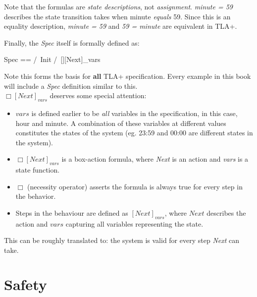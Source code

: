 Note that the formulas are \textit{state descriptions}, not \textit{assignment}.
\textit{minute = 59} describes the state transition takes when minute
\textit{equals} 59. Since this is an equality description, \textit{minute = 59}
and \textit{59 = minute} are equivalent in TLA+.\newline

Finally, the \textit{Spec} itself is formally defined as:\newline
\begin{tla}
    Spec ==
        /\ Init
        /\ [][Next]_vars
\end{tla}
\begin{tlatex}
%
%
%
%
\end{tlatex}
\newline

Note this forms the basis for \textbf{all} TLA+ specification. Every example in
this book will include a \textit{Spec} definition similar to this.\\

$\Box[Next]_{vars}$ deserves some special attention:
\begin{itemize}
    \item $vars$ is defined earlier to be \textit{all} variables in the specification, in
    this case, hour and minute. A combination of these variables at different
    values constitutes the states of the system (eg. 23:59 and 00:00 are different states in the system).
    \item $\Box[Next]_{vars}$ is a box-action formula, where \textit{Next} is an
    action and \textit{vars} is a state function.
    \item $\Box$ (necessity operator) asserts the formula is always true for every step in the behavior.
    \item Steps in the behaviour are defined as $[Next]_{vars}$, where $Next$
    describes the action and $vars$ capturing all variables representing the state.
\end{itemize}

This can be roughly translated to: the system is valid for every step
\textit{Next} can take.

\section{Safety}

